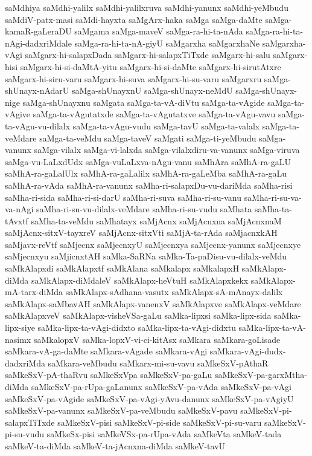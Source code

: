 {saMdhiya
saMdhi-yalilx
saMdhi-yalilxruva
saMdhi-yanunx
saMdhi-yeMbudu
saMdiV-patx-masi
saMdi-hayxta
saMgArx-haka
saMga
saMga-daMte
saMga-kamaR-gaLeraDU
saMgama
saMga-maveV
saMga-ra-hi-ta-nAda
saMga-ra-hi-ta-nAgi-dadxriMdale
saMga-ra-hi-ta-nA-giyU
saMgarxha
saMgarxhaNe
saMgarxha-vAgi
saMgarx-hi-salapxDada
saMgarx-hi-salapxTiTxde
saMgarx-hi-salu
saMgarx-hisi
saMgarx-hi-si-daMtA-yitu
saMgarx-hi-si-daMte
saMgarx-hi-sirutAtxre
saMgarx-hi-siru-varu
saMgarx-hi-suva
saMgarx-hi-su-varu
saMgarxru
saMga-shUnayx-nAdarU
saMga-shUnayxnU
saMga-shUnayx-neMdU
saMga-shUnayx-nige
saMga-shUnayxnu
saMgata
saMga-ta-vA-diVtu
saMga-ta-vAgide
saMga-ta-vAgive
saMga-ta-vAgutatxde
saMga-ta-vAgutatxve
saMga-ta-vAgu-vavu
saMga-ta-vAgu-vu-dilalx
saMga-ta-vAgu-vudu
saMga-tavU
saMga-ta-valalx
saMga-ta-veMdare
saMga-ta-veMdu
saMga-taveV
saMgati
saMga-ti-yeMbudu
saMga-vanunx
saMga-vilalx
saMga-vi-lalxda
saMga-vilalxdiru-va-vanunx
saMga-viruva
saMga-vu-LaLxdUdx
saMga-vuLaLxva-nAgu-vanu
saMhAra
saMhA-ra-gaLU
saMhA-ra-gaLalUlx
saMhA-ra-gaLalilx
saMhA-ra-gaLeMba
saMhA-ra-gaLu
saMhA-ra-vAda
saMhA-ra-vanunx
saMha-ri-salapxDu-vu-dariMda
saMha-risi
saMha-ri-sida
saMha-ri-si-darU
saMha-ri-suva
saMha-ri-su-vanu
saMha-ri-su-va-va-nAgi
saMha-ri-su-vu-dilalx-veMdare
saMha-ri-su-vudu
saMhata
saMha-ta-tAvxtf
saMha-ta-veMdu
saMhatayx
saMjAcnx
saMjAcnxna
saMjAcnxnaM
saMjAcnx-sitxV-tayxreV
saMjAcnx-sitxVti
saMjA-ta-rAda
saMjacnxkAH
saMjavx-reVtf
saMjecnx
saMjecnxyU
saMjecnxya
saMjecnx-yanunx
saMjecnxye
saMjecnxyu
saMjicnxtAH
saMka-SaRNa
saMka-Ta-paDisu-vu-dilalx-veMdu
saMkAlapxdi
saMkAlapxtf
saMkAlana
saMkalapx
saMkalapxH
saMkAlapx-diMda
saMkAlapx-diMdaleV
saMkAlapx-heVtuH
saMkAlapxkekx
saMkAlapx-mA-tarx-diMda
saMkAlapx-sAdhana-vasutx
saMkAlapx-sA-mAnayx-dalilx
saMkAlapx-saMbavAH
saMkAlapx-vanenxV
saMkAlapxve
saMkAlapx-veMdare
saMkAlapxveV
saMkAlapx-visheVSa-gaLu
saMka-lipxsi
saMka-lipx-sida
saMka-lipx-siye
saMka-lipx-ta-vAgi-didxto
saMka-lipx-ta-vAgi-didxtu
saMka-lipx-ta-vA-nasimx
saMkalopxV
saMka-lopxV-vi-ci-kitAsx
saMkara
saMkara-goLisade
saMkara-vA-ga-daMte
saMkara-vAgade
saMkara-vAgi
saMkara-vAgi-dudx-dadxriMda
saMkara-veMbudu
saMkarx-mi-su-vavu
saMkeSxV-pAthaR
saMkeSxV-pA-thaRvu
saMkeSxVpa
saMkeSxV-pa-gaLu
saMkeSxV-pa-garxMtha-diMda
saMkeSxV-pa-rUpa-gaLanunx
saMkeSxV-pa-vAda
saMkeSxV-pa-vAgi
saMkeSxV-pa-vAgide
saMkeSxV-pa-vAgi-yAvu-danunx
saMkeSxV-pa-vAgiyU
saMkeSxV-pa-vanunx
saMkeSxV-pa-veMbudu
saMkeSxV-pavu
saMkeSxV-pi-salapxTiTxde
saMkeSxV-pisi
saMkeSxV-pi-side
saMkeSxV-pi-su-varu
saMkeSxV-pi-su-vudu
saMkeSx-pisi
saMkeVSx-pa-rUpa-vAda
saMkeVta
saMkeV-tada
saMkeV-ta-diMda
saMkeV-ta-jAcnxna-diMda
saMkeV-tavU
}
